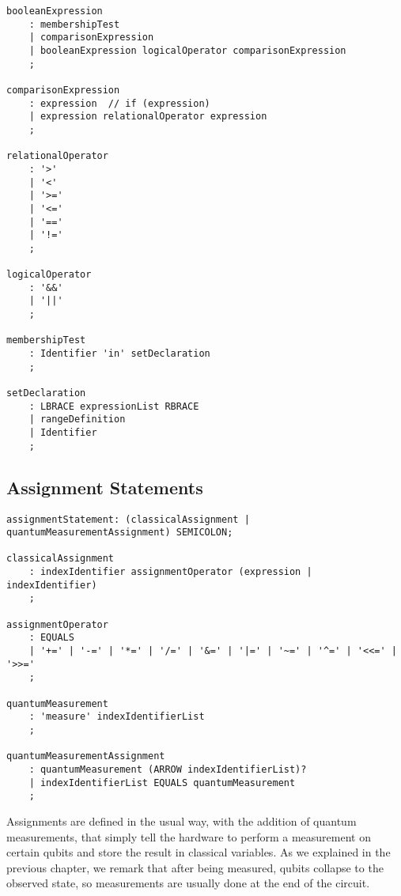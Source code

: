 \documentclass[12pt,a4paper]{report}
\theoremstyle{definition}
\theoremstyle{definition}
\theoremstyle{definition}
\begin{document}
\begin{lstlisting}
booleanExpression
    : membershipTest
    | comparisonExpression
    | booleanExpression logicalOperator comparisonExpression
    ;

comparisonExpression
    : expression  // if (expression)
    | expression relationalOperator expression
    ;

relationalOperator
    : '>'
    | '<'
    | '>='
    | '<='
    | '=='
    | '!='
    ;

logicalOperator
    : '&&'
    | '||'
    ;

membershipTest
    : Identifier 'in' setDeclaration
    ;

setDeclaration
    : LBRACE expressionList RBRACE
    | rangeDefinition
    | Identifier
    ;
\end{lstlisting}

\pagebreak

\subsection{Assignment Statements}
\begin{lstlisting}
assignmentStatement: (classicalAssignment | quantumMeasurementAssignment) SEMICOLON;

classicalAssignment
    : indexIdentifier assignmentOperator (expression | indexIdentifier)
    ;

assignmentOperator
    : EQUALS
    | '+=' | '-=' | '*=' | '/=' | '&=' | '|=' | '~=' | '^=' | '<<=' | '>>='
    ;

quantumMeasurement
    : 'measure' indexIdentifierList
    ;

quantumMeasurementAssignment
    : quantumMeasurement (ARROW indexIdentifierList)?
    | indexIdentifierList EQUALS quantumMeasurement
    ;
\end{lstlisting}
Assignments are defined in the usual way, with the addition of quantum measurements, that simply tell the hardware to perform a measurement on certain qubits and store the result in classical variables. As we explained in the previous chapter, we remark that after being measured, qubits collapse to the observed state, so measurements are usually done at the end of the circuit.\\
\end{document}
